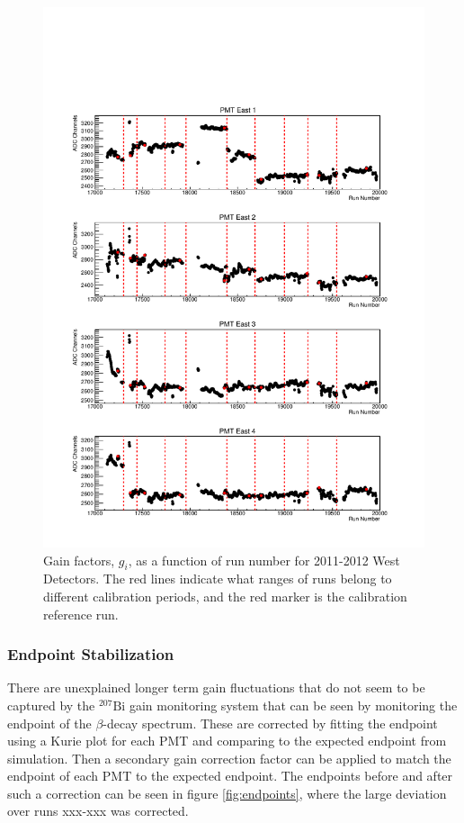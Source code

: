 \begin{figure}[p] 
  \centering
  \includegraphics[page=4,scale=.8]{3-UCNAAnalysis/2011-2012_gain.pdf}
  \caption{Gain factors, $g_i$, as a function of run number for 2011-2012 West Detectors.
    The red lines indicate what ranges of runs belong to
    different calibration periods, and the red marker is the calibration reference run.}
  \label{fig:2011-2012pulser_West}
\end{figure}

\subsubsection{Endpoint Stabilization}

There are unexplained longer term gain fluctuations that do not seem to be captured by the
$^{207}\mathrm{Bi}$ gain monitoring system that can be seen by monitoring the endpoint of the
$\beta$-decay spectrum. These are corrected by fitting the endpoint using a Kurie plot for each
PMT and comparing to the expected endpoint from simulation. Then a secondary gain correction
factor can be applied to match the endpoint of each PMT to the expected endpoint. The endpoints
before and after such a correction can be seen in figure \ref{fig:endpoints}, where the
large deviation over runs xxx-xxx was corrected.



